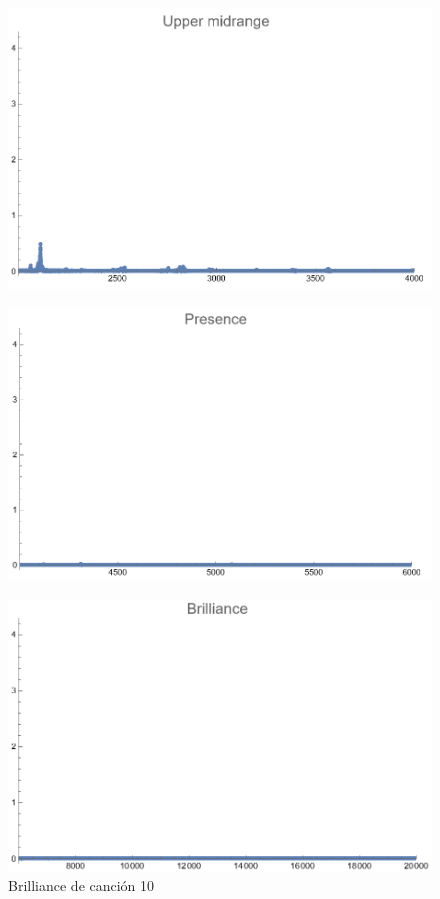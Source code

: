 \documentclass[12pt, letterpaper]{article}
\begin{document}
\begin{figure}[H]
  \centering
  \begin{minipage}{.5\textwidth}
    \centering
    \includegraphics[width=.9\linewidth]{imgs/Cancion10/upmid.png}
    \label{fig:10f}
  \end{minipage}%
  \begin{minipage}{.5\textwidth}
    \centering
    \includegraphics[width=.9\linewidth]{imgs/Cancion10/presence.png}
    \label{fig:10g}
  \end{minipage}
\end{figure}
\begin{figure}[H]
  \centering
  \includegraphics[width=.45\linewidth]{imgs/Cancion10/brilliance.png}
  \caption{Brilliance de canción 10}
  \label{fig:10h}
\end{figure}
\end{document}
